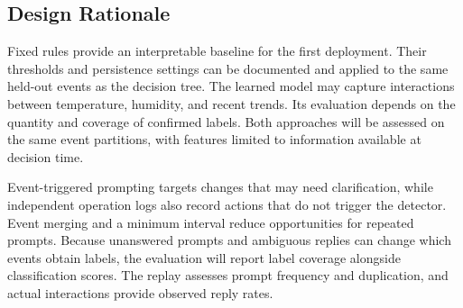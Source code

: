 \subsection{Design Rationale}
Fixed rules provide an interpretable baseline for the first deployment. Their thresholds and persistence settings can be documented and applied to the same held-out events as the decision tree. The learned model may capture interactions between temperature, humidity, and recent trends. Its evaluation depends on the quantity and coverage of confirmed labels. Both approaches will be assessed on the same event partitions, with features limited to information available at decision time.

Event-triggered prompting targets changes that may need clarification, while independent operation logs also record actions that do not trigger the detector. Event merging and a minimum interval reduce opportunities for repeated prompts. Because unanswered prompts and ambiguous replies can change which events obtain labels, the evaluation will report label coverage alongside classification scores. The replay assesses prompt frequency and duplication, and actual interactions provide observed reply rates.

